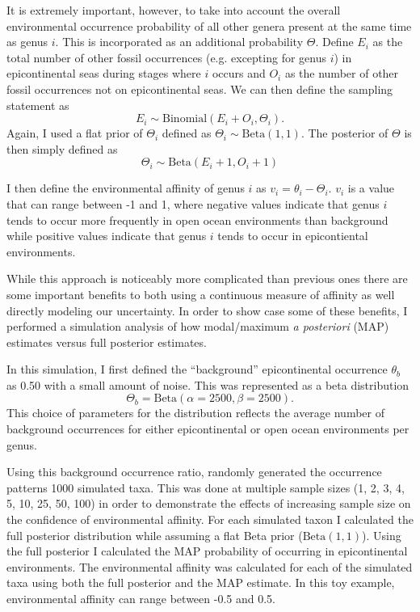 \documentclass[12pt,letterpaper]{article}
\begin{document}
It is extremely important, however, to take into account the overall environmental occurrence probability of all other genera present at the same time as genus \(i\). This is incorporated as an additional probability \(\Theta\). Define \(E_{i}\) as the total number of other fossil occurrences (e.g. excepting for genus \(i\)) in epicontinental seas during stages where \(i\) occurs and \(O_{i}\) as the number of other fossil occurrences not on epicontinental seas. We can then define the sampling statement as
\begin{equation}
  E_{i} \sim \mathrm{Binomial}(E_{i} + O_{i}, \Theta_{i}).
  \label{eq:bck_lik}
\end{equation}
Again, I used a flat prior of \(\Theta_{i}\) defined as \(\Theta_{i} \sim \mathrm{Beta}(1, 1)\). The posterior of \(\Theta\) is then simply defined as
\begin{equation}
  \Theta_{i} \sim \mathrm{Beta}(E_{i} + 1, O_{i} + 1)
  \label{eq:bck_post}
\end{equation}

I then define the environmental affinity of genus \(i\) as \(v_{i} = \theta_{i} - \Theta_{i}\). \(v_{i}\) is a value that can range between -1 and 1, where negative values indicate that genus \(i\) tends to occur more frequently in open ocean environments than background while positive values indicate that genus \(i\) tends to occur in epicontiental environments.

While this approach is noticeably more complicated than previous ones \citep{Foote2006,Miller2001,Simpson2009,Kiessling2007a} there are some important benefits to both using a continuous measure of affinity as well directly modeling our uncertainty. In order to show case some of these benefits, I performed a simulation analysis of how modal/maximum \textit{a posteriori} (MAP) estimates versus full posterior estimates.

In this simulation, I first defined the ``background'' epicontinental occurrence \(\theta_{b}\) as 0.50 with a small amount of noise. This was represented as a beta distribution 
\begin{equation}
  \Theta_{b} = \mathrm{Beta}(\alpha = 2500, \beta = 2500). 
  \label{eq:bck_sim}
\end{equation}
This choice of parameters for the distribution reflects the average number of background occurrences for either epicontinental or open ocean environments per genus.

Using this background occurrence ratio, randomly generated the occurrence patterns 1000 simulated taxa. This was done at multiple sample sizes (1, 2, 3, 4, 5, 10, 25, 50, 100) in order to demonstrate the effects of increasing sample size on the confidence of environmental affinity. For each simulated taxon I calculated the full posterior distribution while assuming a flat Beta prior (\(\mathrm{Beta}(1, 1)\)). Using the full posterior I calculated the MAP probability of occurring in epicontinental environments. The environmental affinity was calculated for each of the simulated taxa using both the full posterior and the MAP estimate. In this toy example, environmental affinity can range between -0.5 and 0.5.
\end{document}
